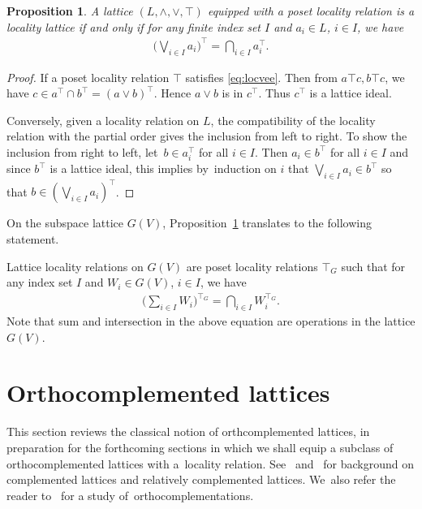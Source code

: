 \documentclass[10pt,a4paper]{amsart}
\numberwithin{equation}{section}
\newtheorem{Proposition}[Theorem]{Proposition}
\newcommand{\loc}{locality\xspace}
\begin{document}
\begin{Proposition}\label{prop:locvee} A lattice $(L, \wedge, \vee, \top)$ equipped with a poset \loc relation is a \loc lattice if and only if for any finite index set $I$ and $a_i\in L$, $i\in I$, we have
	\begin{gather}\label{eq:locvee}
	\bigg(\bigvee_{i\in I} a_i\bigg)^{\top } =\bigcap _{i\in I} a_i^{\top}.
	\end{gather}
\end{Proposition}
\begin{proof} If a poset locality relation $\top$ satisfies
		\eqref{eq:locvee}. Then from $a\top c, b\top c$, we have $c\in a^\top \cap b^\top = (a\vee b)^\top$. Hence $a\vee b$ is in $c^\top$. Thus $c^\top$ is a lattice ideal.
		
Conversely, given a \loc relation on $L$, the compatibility of the \loc relation with the partial order gives the inclusion from left to right. To show the inclusion from right to left, let~$b\in a_i^\top$ for all $i\in I$. Then $a_i\in b^\top$ for all $i\in I$ and since $b^\top$ is a lattice ideal, this implies by~induction on $i$ that $\bigvee_{i\in I} a_i \in b^\top$ so that $b\in 	 \left(\bigvee_{i\in I} a_i\right)^{\top }$.
\end{proof}

On the subspace lattice $G(V)$, Proposition~\ref{prop:locvee} translates to the following statement.
\begin{Example} %
		Lattice locality relations on $G(V)$ are poset locality relations $\top_G$ such that for any index set $I$ and $W_i\in G(V)$, $i\in I$, we have
	\begin{gather*}%
	\bigg(\sum_{i\in I} W_i\bigg)^{\top _G} =\bigcap_{i\in I} W_i^{\top _G}.
	\end{gather*}
	Note that sum and intersection in the above equation are operations in the lattice $G(V)$.
\end{Example}

\section{Orthocomplemented lattices}\label{sec:ortholatt}
This section reviews the classical notion of orthcomplemented lattices, in preparation for the forthcoming sections in which we shall equip a subclass of orthocomplemented lattices with a~\loc relation.
See~\cite[Section~II.6 ]{B} and~\cite[Section~I.6]{Gra1} for background on complemented lattices and relatively complemented lattices. We~also refer the reader to~\cite{CM} for a study of~ortho\-complementations.
\end{document}
